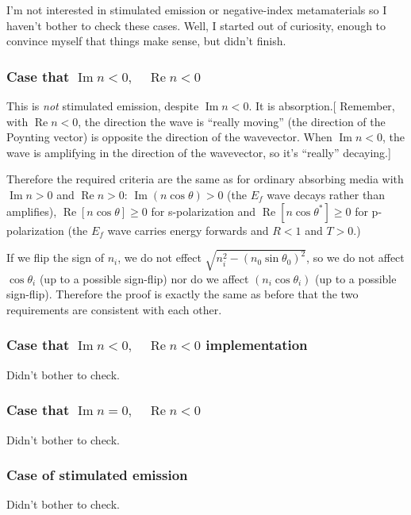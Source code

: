 \documentclass[12pt]{article}
\renewcommand{\(}{\left(}
\renewcommand{\)}{\right)}
\renewcommand{\Im}{\operatorname{Im}}
\renewcommand{\Re}{\operatorname{Re}}
\begin{document}
I'm not interested in stimulated emission or negative-index metamaterials so I haven't bother to check these cases. Well, I started out of curiosity, enough to convince myself that things make sense, but didn't finish.

\subsubsection{Case that $\Im n<0, \quad \Re n < 0$}

This is \emph{not} stimulated emission, despite $\Im n<0$. It is absorption.[ Remember, with $\Re n<0$, the direction the wave is ``really moving'' (the direction of the Poynting vector) is opposite the direction of the wavevector. When $\Im n<0$, the wave is amplifying in the direction of the wavevector, so it's ``really'' decaying.]

Therefore the required criteria are the same as for ordinary absorbing media with $\Im n>0$ and $\Re n > 0$: $\Im(n \cos \theta)>0$ (the $E_f$ wave decays rather than amplifies),  $\Re[n \cos\theta]\geq 0$ for s-polarization and $\Re[n \cos \theta^*]\geq 0$ for p-polarization (the $E_f$ wave carries energy forwards and $R<1$ and $T>0$.)

If we flip the sign of $n_i$, we do not effect $\sqrt{n_i^2 - (n_0 \sin \theta_0)^2}$, so we do not affect $\cos \theta_i$ (up to a possible sign-flip) nor do we affect $(n_i \cos \theta_i)$ (up to a possible sign-flip). Therefore the proof is exactly the same as before that the two requirements are consistent with each other.

\subsubsection{Case that $\Im n<0, \quad \Re n < 0$ implementation}

Didn't bother to check.

\subsubsection{Case that $\Im n=0, \quad \Re n < 0$}

Didn't bother to check.

\subsubsection{Case of stimulated emission}

Didn't bother to check.
\end{document}
